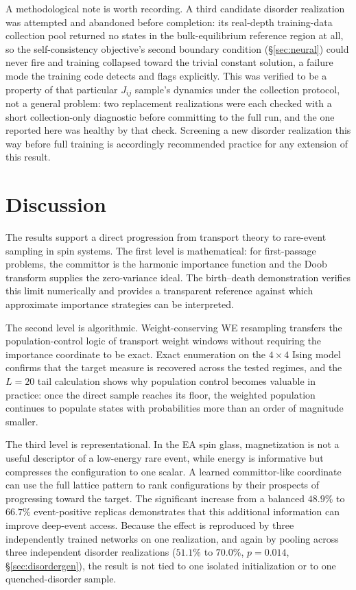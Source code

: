 \documentclass[a4paper,fleqn]{cas-sc}
\begin{document}
A methodological note is worth recording. A third candidate disorder realization was
attempted and abandoned before completion: its real-depth training-data collection pool
returned no states in the bulk-equilibrium reference region at all, so the self-consistency
objective's second boundary condition (\S\ref{sec:neural}) could never fire and training
collapsed toward the trivial constant solution, a failure mode the training code detects and
flags explicitly. This was verified to be a property of that particular $J_{ij}$ sample's
dynamics under the collection protocol, not a general problem: two replacement realizations
were each checked with a short collection-only diagnostic before committing to the full
run, and the one reported here was healthy by that check. Screening a new disorder realization
this way before full training is accordingly recommended practice for any extension of this
result.

\FloatBarrier

\section{Discussion}\label{sec:discussion}

The results support a direct progression from transport theory to rare-event sampling in spin
systems. The first level is mathematical: for first-passage problems, the committor is the
harmonic importance function and the Doob transform supplies the zero-variance ideal. The
birth--death demonstration verifies this limit numerically and provides a transparent reference
against which approximate importance strategies can be interpreted.

The second level is algorithmic. Weight-conserving WE resampling transfers the population-control
logic of transport weight windows without requiring the importance coordinate to be exact. Exact
enumeration on the $4\times4$ Ising model confirms that the target measure is recovered across
the tested regimes, and the $L=20$ tail calculation shows why population control becomes valuable
in practice: once the direct sample reaches its floor, the weighted population continues to
populate states with probabilities more than an order of magnitude smaller.

The third level is representational. In the EA spin glass, magnetization is not a useful
descriptor of a low-energy rare event, while energy is informative but compresses the
configuration to one scalar. A learned committor-like coordinate can use the full lattice pattern
to rank configurations by their prospects of progressing toward the target. The significant
increase from a balanced $48.9\%$ to $66.7\%$ event-positive replicas demonstrates that this
additional information can improve deep-event access. Because the effect is reproduced by three
independently trained networks on one realization, and again by pooling across three
independent disorder realizations ($51.1\%$ to $70.0\%$, $p=0.014$, \S\ref{sec:disordergen}),
the result is not tied to one isolated initialization or to one quenched-disorder sample.
\end{document}
